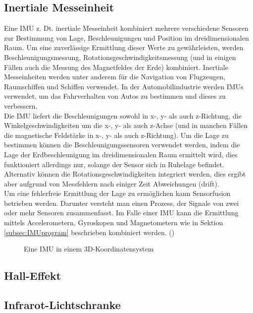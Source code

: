\subsection{Inertiale Messeinheit}
\label{subsec:tIMU}
Eine \ac{IMU} z. Dt. inertiale Messeinheit kombiniert mehrere verschiedene Sensoren zur Bestimmung von Lage, Beschleunigungen und Position im dreidimensionalen Raum. Um eine zuverlässige Ermittlung dieser Werte zu gewährleisten, werden Beschleunigungsmessung, Rotationsgeschwindigkeitsmessung (und in einigen Fällen auch die Messung des Magnetfeldes der Erde) kombiniert. Inertiale Messeinheiten werden unter anderem für die Navigation von Flugzeugen, Raumschiffen und Schiffen verwendet. In der Automobilindustrie werden \ac{IMU}s verwendet, um das Fahrverhalten von Autos zu bestimmen und dieses zu verbessern.\\
Die \ac{IMU} liefert die Beschleunigungen sowohl in x-, y- als auch z-Richtung, die Winkelgeschwindigkeiten um die x-, y- als auch z-Achse (und in manchen Fällen die magnetische Feldstärke in x-, y- als auch z-Richtung). Um die Lage zu bestimmen können die Beschleunigungssensoren verwendet werden, indem die Lage der Erdbeschleunigung im dreidimensionalen Raum ermittelt wird, dies funktioniert allerdings nur, solange der Sensor sich in Ruhelage befindet. Alternativ können die Rotationsgeschwindigkeiten integriert werden, dies ergibt aber aufgrund von Messfehlern nach einiger Zeit Abweichungen (drift).\\ Um eine fehlerfreie Ermittlung der Lage zu ermöglichen kann Sensorfusion betrieben werden. Darunter versteht man einen Prozess, der Signale von zwei oder mehr Sensoren zusammenfasst. Im Falle einer \ac{IMU} kann die Ermittlung mittels Accelerometern, Gyroskopen und Magnetometern wie in Sektion \ref{subsec:IMUprogram} beschrieben kombiniert werden.
(\cite{UCAM-CL-TR-696})
\begin{figure}[h]
\centering
\missingfigure{}
\caption{Eine \ac{IMU} in einem \ac{3D}-Koordinatensystem}
\label{fig:IMU3D}
\end{figure}

\subsection{Hall-Effekt}
\label{subsec:tHall}

\subsection{Infrarot-Lichtschranke}
\label{subsec:tIR}

